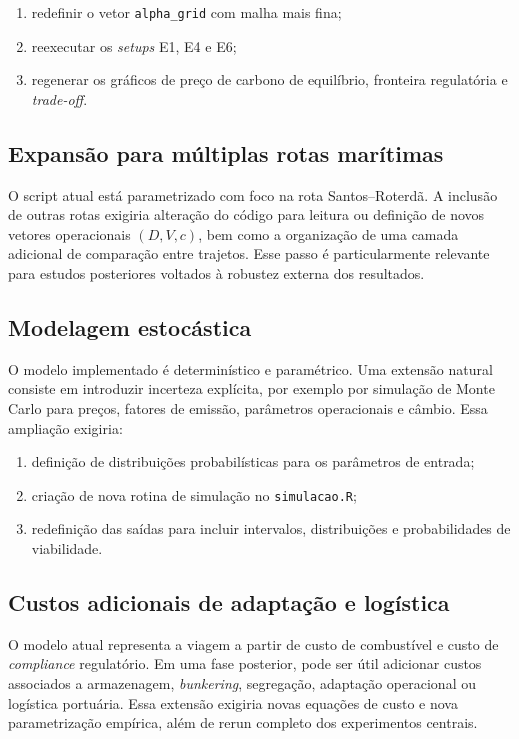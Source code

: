 \begin{enumerate}
    \item redefinir o vetor \texttt{alpha\_grid} com malha mais fina;
    \item reexecutar os \emph{setups} E1, E4 e E6;
    \item regenerar os gráficos de preço de carbono de equilíbrio, fronteira regulatória e \emph{trade-off}.
\end{enumerate}

\subsection{Expansão para múltiplas rotas marítimas}

O script atual está parametrizado com foco na rota Santos--Roterdã. A inclusão de outras rotas exigiria alteração do código para leitura ou definição de novos vetores operacionais $(D,V,c)$, bem como a organização de uma camada adicional de comparação entre trajetos. Esse passo é particularmente relevante para estudos posteriores voltados à robustez externa dos resultados.

\subsection{Modelagem estocástica}

O modelo implementado é determinístico e paramétrico. Uma extensão natural consiste em introduzir incerteza explícita, por exemplo por simulação de Monte Carlo para preços, fatores de emissão, parâmetros operacionais e câmbio. Essa ampliação exigiria:

\begin{enumerate}
    \item definição de distribuições probabilísticas para os parâmetros de entrada;
    \item criação de nova rotina de simulação no \texttt{simulacao.R};
    \item redefinição das saídas para incluir intervalos, distribuições e probabilidades de viabilidade.
\end{enumerate}

\subsection{Custos adicionais de adaptação e logística}

O modelo atual representa a viagem a partir de custo de combustível e custo de \emph{compliance} regulatório. Em uma fase posterior, pode ser útil adicionar custos associados a armazenagem, \emph{bunkering}, segregação, adaptação operacional ou logística portuária. Essa extensão exigiria novas equações de custo e nova parametrização empírica, além de rerun completo dos experimentos centrais.

